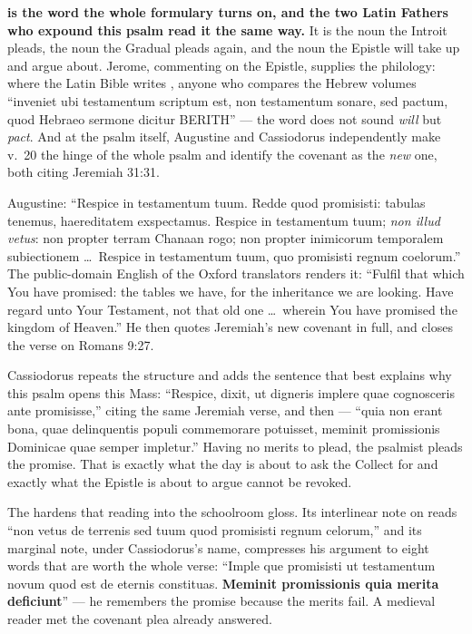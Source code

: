 \textbf{ is the word the whole formulary turns on, and the
two Latin Fathers who expound this psalm read it the same way.} It is the noun the Introit pleads,
the noun the Gradual pleads again, and the noun the Epistle will take up and
argue about. Jerome, commenting on the Epistle, supplies the philology: where
the Latin Bible writes , anyone who compares the Hebrew
volumes ``inveniet ubi testamentum scriptum est, non testamentum sonare, sed
pactum, quod Hebraeo sermone dicitur BERITH'' --- the word does not sound
\textit{will} but \textit{pact}. And at the psalm itself, Augustine and
Cassiodorus independently make v.~20 the hinge of the whole psalm and identify
the covenant as the \emph{new} one, both citing Jeremiah 31:31.

\begin{witnessnote}
Augustine: ``Respice in testamentum tuum. Redde quod promisisti: tabulas
tenemus, haereditatem exspectamus. Respice in testamentum tuum; \textit{non
illud vetus}: non propter terram Chanaan rogo; non propter inimicorum
temporalem subiectionem \dots\ Respice in testamentum tuum, quo promisisti
regnum coelorum.'' The public-domain English of the Oxford translators renders
it: ``Fulfil that which You have promised: the tables we have, for the
inheritance we are looking. Have regard unto Your Testament, not that old one
\dots\ wherein You have promised the kingdom of Heaven.'' He then quotes
Jeremiah's new covenant in full, and closes the verse on Romans 9:27.

Cassiodorus repeats the structure and adds the sentence that best explains why
this psalm opens this Mass: ``Respice, dixit, ut digneris implere quae
cognosceris ante promisisse,'' citing the same Jeremiah verse, and then ---
``quia non erant bona, quae delinquentis populi commemorare potuisset, meminit
promissionis Dominicae quae semper impletur.'' Having no merits to plead, the
psalmist pleads the promise. That is exactly what the day is about to ask the
Collect for and exactly what the Epistle is about to argue cannot be revoked.
\end{witnessnote}

The  hardens that reading into the schoolroom gloss. Its
interlinear note on  reads ``non vetus de
terrenis sed tuum quod promisisti regnum celorum,'' and its marginal note,
under Cassiodorus's name, compresses his argument to eight words that are worth
the whole verse: ``Imple que promisisti ut testamentum novum quod est de
eternis constituas. \textbf{Meminit promissionis quia merita deficiunt}'' ---
he remembers the promise because the merits fail. A medieval reader met the
covenant plea already answered.

